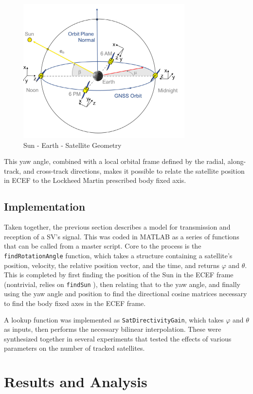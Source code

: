 \documentclass[11pt]{article}
\begin{document}
\begin{figure}[h]
\centering
\includegraphics[width=.5\textwidth]{../Images/geom.png}
\caption{Sun - Earth - Satellite Geometry}
\label{fig:geom}
\end{figure}

This yaw angle, combined with a local orbital frame defined by the radial, along-track, and cross-track directions, makes it possible to relate the satellite position in ECEF to the Lockheed Martin prescribed body fixed axis. 

\FloatBarrier
\subsection{Implementation}
Taken together, the previous section describes a model for transmission and reception of a SV's signal. This was coded in MATLAB as a series of functions that can be called from a master script. Core to the process is the \verb|findRotationAngle| function, which takes a structure containing a satellite's position, velocity, the relative position vector, and the time, and returns $\varphi$ and $\theta$. This is completed by first finding the position of the Sun in the ECEF frame (nontrivial, relies on \verb|findSun| \cite{astro}), then relating that to the yaw angle, and finally using the yaw angle and position to find the directional cosine matrices necessary to find the body fixed axes in the ECEF frame.

A lookup function was implemented as \verb|SatDirectivityGain|, which takes $\varphi$ and $\theta$ as inputs, then performs the necessary bilinear interpolation. These were synthesized together in several experiments that tested the effects of various parameters on the number of tracked satellites.


\section{Results and Analysis}
\end{document}

